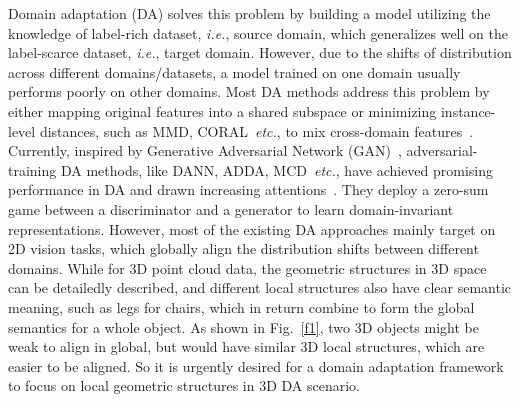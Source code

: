 \documentclass{article}
\begin{document}
Domain adaptation (DA) solves this problem by building a model utilizing the knowledge of label-rich dataset, \textit{i.e.}, source domain, which generalizes well on the label-scarce dataset, \textit{i.e.}, target domain. However, due to the shifts of distribution across different domains/datasets, a model trained on one domain usually performs poorly on other domains. Most DA methods address this problem by either mapping original features into a shared subspace or minimizing instance-level distances, such as MMD, CORAL~\textit{etc.}, to mix cross-domain features~\cite{borgwardt2006integrating,long2013transfer,sun2016deep}. Currently, inspired by Generative Adversarial Network (GAN)~\cite{goodfellow2014generative}, adversarial-training DA methods, like DANN, ADDA, MCD~\textit{etc.}, have achieved promising performance in DA and drawn increasing attentions~\cite{ganin2014unsupervised,tzeng2017adversarial,saito2018maximum}. They deploy a zero-sum game between a discriminator and a generator to learn domain-invariant representations. However, most of the existing DA approaches mainly target on 2D vision tasks, which globally align the distribution shifts between different domains.  While for 3D point cloud data, the geometric structures in 3D space can be detailedly described, and different local structures also have clear semantic meaning, such as legs for chairs, which in return combine to form the global semantics for a whole object. As shown in Fig.~\ref{f1}, two 3D objects might be weak to align in global, but would have similar 3D local structures, which are easier to be aligned. So it is urgently desired for a domain adaptation framework to focus on local geometric structures in 3D DA scenario. 
\end{document}
